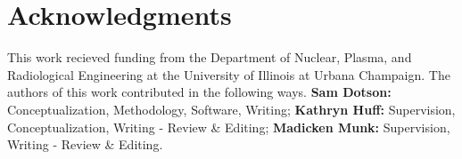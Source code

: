 \section{Acknowledgments}
This work recieved funding from the Department of Nuclear, Plasma, and Radiological Engineering at the University of Illinois at Urbana Champaign. 
The authors of this work contributed in the following ways.
\textbf{Sam Dotson:} Conceptualization, Methodology, Software, Writing;
\textbf{Kathryn Huff:} Supervision, Conceptualization, Writing - Review \& Editing;
\textbf{Madicken Munk:} Supervision, Writing - Review \& Editing.

